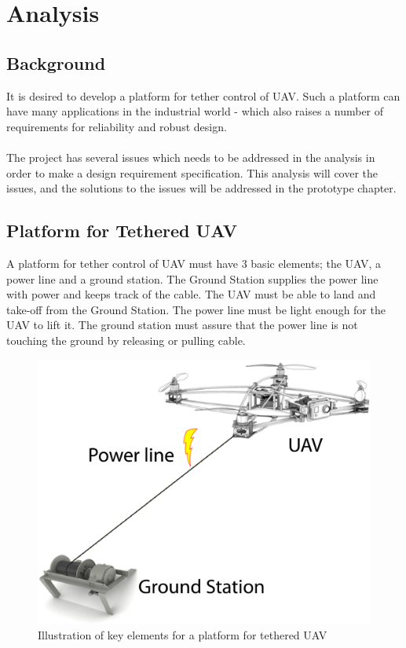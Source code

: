 
\chapter{Analysis}

\section{Background}
It is desired to develop a platform for tether control of UAV. Such a platform can have many applications in the industrial world - which also raises a number of requirements for reliability and robust design. \\
\\
The project has several issues which needs to be addressed in the analysis in order to make a design requirement specification. This analysis will cover the issues, and the solutions to the issues will be addressed in the prototype chapter. 


\section{Platform for Tethered UAV}
A platform for tether control of UAV must have 3 basic elements; the UAV, a power line and a ground station. The Ground Station supplies the power line with power and keeps track of the cable. The UAV must be able to land and take-off from the Ground Station. The power line must be light enough for the UAV to lift it. The ground station must assure that the power line is not touching the ground by releasing or pulling cable.

\begin{figure}[hbtp]
\centering
\includegraphics[scale=0.5]{graphics/overall-system.png}
\caption{Illustration of key elements for a platform for tethered UAV}
\end{figure}


